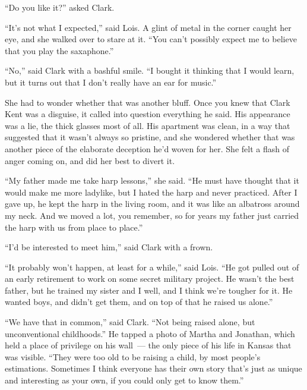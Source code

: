 \documentclass[ebook,12pt]{memoir}
\begin{document}
``Do you like it?'' asked Clark.

``It's not what I expected,'' said Lois. A glint of metal in the corner
caught her eye, and she walked over to stare at it. ``You can't possibly
expect me to believe that you play the saxaphone.''

``No,'' said Clark with a bashful smile. ``I bought it thinking that I
would learn, but it turns out that I don't really have an ear for
music.''

She had to wonder whether that was another bluff. Once you knew that
Clark Kent was a disguise, it called into question everything he said.
His appearance was a lie, the thick glasses most of all. His apartment
was clean, in a way that suggested that it wasn't always so pristine,
and she wondered whether that was another piece of the elaborate
deception he'd woven for her. She felt a flash of anger coming on, and
did her best to divert it.

``My father made me take harp lessons,'' she said. ``He must have
thought that it would make me more ladylike, but I hated the harp and
never practiced. After I gave up, he kept the harp in the living room,
and it was like an albatross around my neck. And we moved a lot, you
remember, so for years my father just carried the harp with us from
place to place.''

``I'd be interested to meet him,'' said Clark with a frown.

``It probably won't happen, at least for a while,'' said Lois. ``He got
pulled out of an early retirement to work on some secret military
project. He wasn't the best father, but he trained my sister and I well,
and I think we're tougher for it. He wanted boys, and didn't get them,
and on top of that he raised us alone.''

``We have that in common,'' said Clark. ``Not being raised alone, but
unconventional childhoods.'' He tapped a photo of Martha and Jonathan,
which held a place of privilege on his wall~--- the only piece of his
life in Kansas that was visible. ``They were too old to be raising a
child, by most people's estimations. Sometimes I think everyone has
their own story that's just as unique and interesting as your own, if
you could only get to know them.''
\end{document}
